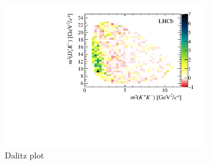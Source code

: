 \begin{figure}[!h]
    \centering
    \includegraphics[width=0.8\textwidth]{figs/B2DsKK/Dalitz_plot_sweighted.pdf}
    \caption{Dalitz plot}
    \label{fig:B2DsKK_Dalitzplot}   
\end{figure}

